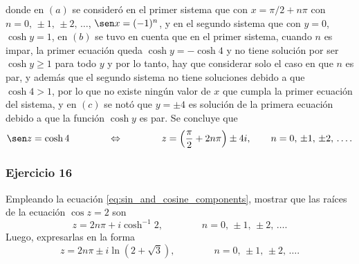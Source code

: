 \documentclass[a4paper]{report}
\begin{document}
donde en \((a)\) se consideró en el primer sistema que con \(x=\pi/2+n\pi\) con \(n=0,\,\pm1,\,\pm2,\,\dots\), \(\sen x=(-1)^n\), y en el segundo sistema que con \(y=0\), \(\cosh y=1\), en \((b)\) se tuvo en cuenta que en el primer sistema, cuando \(n\) es impar, la primer ecuación queda \(\cosh y=-\cosh 4\) y no tiene solución por ser \(\cosh y\geq1\) para todo \(y\) y por lo tanto, hay que considerar solo el caso en que \(n\) es par, y además que el segundo sistema no tiene soluciones debido a que \(\cosh4>1\), por lo que no existe ningún valor de \(x\) que cumpla la primer ecuación del sistema, y en \((c)\) se notó que \(y=\pm4\) es solución de la primera ecuación debido a que la función \(\cosh y\) es par. Se concluye que 
\[
 \sen z=\cosh 4
 \qquad\qquad\Leftrightarrow\qquad\qquad
 z=\left(\frac{\pi}{2}+2n\pi\right)\pm4i,
 \qquad n=0,\,\pm1,\,\pm2,\,\dots.
\]

\subsubsection{Ejercicio 16}

Empleando la ecuación \ref{eq:sin_and_cosine_components}, mostrar que las raíces de la ecuación \(\cos z=2\) son
\[
 z=2n\pi+i\cosh^{-1}2,
 \qquad\qquad n=0,\,\pm1,\,\pm2,\,\dots.
\]
Luego, expresarlas en la forma
\[
 z=2n\pi\pm i\ln(2+\sqrt{3}),
 \qquad\qquad n=0,\,\pm1,\,\pm2,\,\dots.
\]
\end{document}
